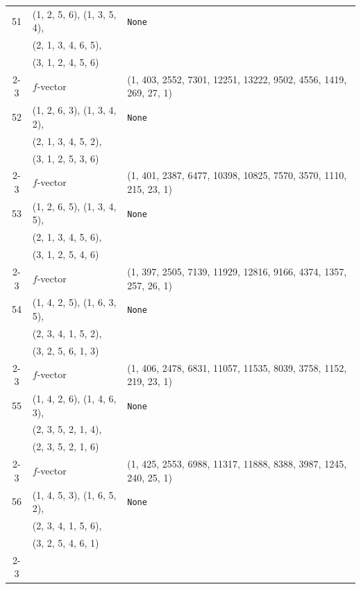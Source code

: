\documentclass[10pt]{amsart}
\numberwithin{equation}{section}
\theoremstyle{plain}
\theoremstyle{definition}
\theoremstyle{remark}
\begin{document}
{\begin{longtable}{c|l|l}
		51 & (1, 2, 5, 6), (1, 3, 5, 4), & \texttt{None} \\
		& (2, 1, 3, 4, 6, 5), &  \\
		& (3, 1, 2, 4, 5, 6) &  \\ \cline{2-3}
		
		& $f$-vector & {(1, 403, 2552, 7301, 12251, 13222, 9502, 4556, 1419, 269, 27, 1)} \\
		\midrule
		
		52 & (1, 2, 6, 3), (1, 3, 4, 2), & \texttt{None} \\
		& (2, 1, 3, 4, 5, 2), &  \\
		& (3, 1, 2, 5, 3, 6) &  \\ \cline{2-3}
		
		& $f$-vector & {(1, 401, 2387, 6477, 10398, 10825, 7570, 3570, 1110, 215, 23, 1)} \\
		\midrule
		
		53 & (1, 2, 6, 5), (1, 3, 4, 5), & \texttt{None} \\
		& (2, 1, 3, 4, 5, 6), &  \\
		& (3, 1, 2, 5, 4, 6) &  \\ \cline{2-3}
		
		& $f$-vector & {(1, 397, 2505, 7139, 11929, 12816, 9166, 4374, 1357, 257, 26, 1)} \\
		\midrule
		
		54 & (1, 4, 2, 5), (1, 6, 3, 5), & \texttt{None} \\
		& (2, 3, 4, 1, 5, 2), &  \\
		& (3, 2, 5, 6, 1, 3) &  \\ \cline{2-3}
		
		& $f$-vector & {(1, 406, 2478, 6831, 11057, 11535, 8039, 3758, 1152, 219, 23, 1)} \\
		\midrule
		
		55 & (1, 4, 2, 6), (1, 4, 6, 3), & \texttt{None} \\
		& (2, 3, 5, 2, 1, 4), &  \\
		& (2, 3, 5, 2, 1, 6) &  \\ \cline{2-3}
		
		& $f$-vector & {(1, 425, 2553, 6988, 11317, 11888, 8388, 3987, 1245, 240, 25, 1)} \\
		\midrule
		
		56 & (1, 4, 5, 3), (1, 6, 5, 2), & \texttt{None} \\
		& (2, 3, 4, 1, 5, 6), &  \\
		& (3, 2, 5, 4, 6, 1) &  \\ \cline{2-3}
		

\end{longtable}}
\end{document}
